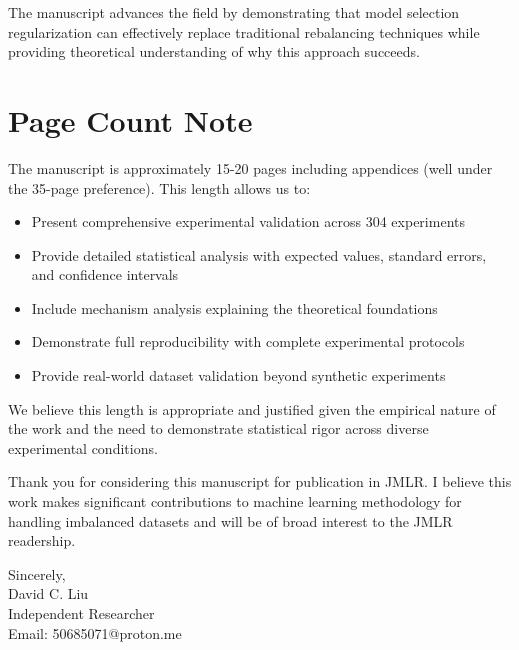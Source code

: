 \documentclass[11pt]{article}
\begin{document}
The manuscript advances the field by demonstrating that model selection regularization can effectively replace traditional rebalancing techniques while providing theoretical understanding of why this approach succeeds.

\section*{Page Count Note}

The manuscript is approximately 15-20 pages including appendices (well under the 35-page preference). This length allows us to:
\begin{itemize}
\item Present comprehensive experimental validation across 304 experiments
\item Provide detailed statistical analysis with expected values, standard errors, and confidence intervals
\item Include mechanism analysis explaining the theoretical foundations
\item Demonstrate full reproducibility with complete experimental protocols
\item Provide real-world dataset validation beyond synthetic experiments
\end{itemize}

We believe this length is appropriate and justified given the empirical nature of the work and the need to demonstrate statistical rigor across diverse experimental conditions.

\vspace{1em}

Thank you for considering this manuscript for publication in JMLR. I believe this work makes significant contributions to machine learning methodology for handling imbalanced datasets and will be of broad interest to the JMLR readership.

\vspace{1em}

\noindent
Sincerely,\\[1em]
David C. Liu\\
Independent Researcher\\
Email: 50685071@proton.me
\end{document}
